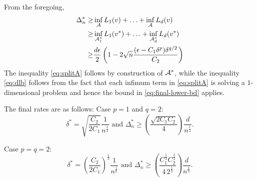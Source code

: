 From the foregoing, 
\begin{align}
 \Delta_n^* \ge & \inf_{\mathcal{A}} L_1(v) + \ldots + \inf_{\mathcal{A}} L_d(v) \nonumber\\
             \ge & \inf_{\mathcal{A}_1^*} L_1(v^*) + \ldots + \inf_{\mathcal{A}_d^*} L_d(v^*) \label{eq:splitA}\\
              \ge & \dfrac{d\epsilon}{2} \left(1 - 2\sqrt{n}  \dfrac{(\epsilon-C_1\delta^p)\delta^{q/2}}{C_2}\right) \label{eq:dlb}
\end{align}
The inequality \eqref{eq:splitA} follows by construction of $\mathcal{A}^*$, while the inequality \eqref{eq:dlb} follows from the fact that each infimum term in \eqref{eq:splitA} is solving a $1$-dimensional problem and hence the bound in \eqref{eq:final-lower-bd} applies.

The final rates are as follows:
Case $p=1$ and $q=2$:
\[
\delta^*= \sqrt{\dfrac{C_2}{2C_1}}\dfrac{1}{n^{\frac{1}{4}}} \text{ and } 
\Delta_n^* \ge \left(\dfrac{\sqrt{2C_1C_2}}{4}\right)\dfrac{d}{n^{\frac{1}{4}}}.
\]

Case $p=q=2$:
\[
\delta^*= \left(\dfrac{C_2}{2C_1}\right)^{\frac{1}{3}}\dfrac{1}{n^{\frac{1}{6}}} \text{ and } \Delta_n^* \ge \left(\dfrac{C_1^{\frac{1}{3}}C_2^{\frac{2}{3}}}{4\, 2^{\frac{1}{3}}}\right)\dfrac{d}{n^{\frac{1}{3}}}.
\]

